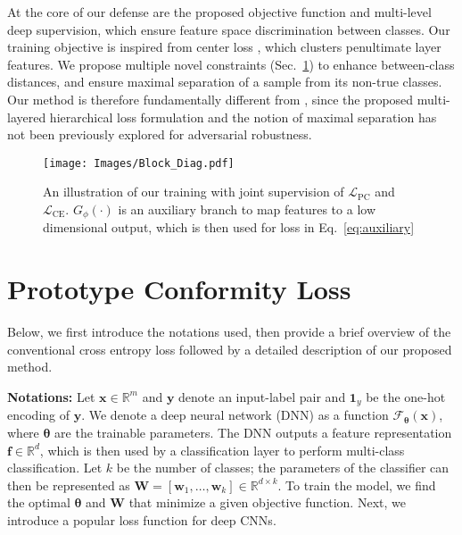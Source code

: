 \documentclass[10pt,twocolumn,letterpaper]{article}
\begin{document}
At the core of our defense are the proposed objective function and multi-level deep supervision, which ensure feature space discrimination between classes. Our training objective is inspired from center loss \cite{wen2016discriminative}, which clusters penultimate layer features. We propose multiple novel constraints (Sec.~\ref{sec:background}) to enhance between-class distances, and ensure maximal separation of a sample from its non-true classes. Our method is therefore fundamentally different from \cite{wen2016discriminative}, since the proposed multi-layered hierarchical loss formulation and the notion of maximal separation has not been previously explored for adversarial robustness. 























\begin{figure}
    \centering
{\texttt{[image: Images/Block\_Diag.pdf]} }
   \vspace{-1em}
    \caption{\small{An illustration of our training with joint supervision of  $\mathcal{L}_{\text{PC}}$ and  $\mathcal{L}_{\text{CE}}$. $G_{\phi}(\cdot)$ is an auxiliary branch to map features to a low dimensional output, which is then used for loss in Eq.~\ref{eq:auxiliary}}}
    \label{fig:block_diag}\vspace{-0.5em}    
\end{figure}

\section{Prototype Conformity Loss}
\label{sec:background}

Below, we first introduce the notations used, then provide a brief overview of the conventional cross entropy loss followed by a detailed description of our proposed method.

\noindent \textbf{Notations:} Let $\bm{x} \in \mathbb{R}^{m}$ and $\bm{y}$ denote an input-label pair and $\bm{1}_{y}$ be the one-hot encoding of $\bm{y}$. We denote a deep neural network (DNN) as a function $\mathcal{F}_{\bm{\theta}}(\bm{x})$,  where $\bm{\theta}$ are the trainable parameters. The DNN outputs a feature representation $\bm{f}\in \mathbb{R}^d$, which is then used by a classification layer to perform multi-class classification. Let $k$ be the number of classes; the parameters of the classifier can then be represented as $\bm{W} = [\bm{w}_1,\ldots,\bm{w}_k] \in \mathbb{R}^{d\times k}$. To train the model, we find the optimal $\bm{\theta}$ and $\bm{W}$ that minimize a given objective function. Next, we introduce a popular loss function for deep CNNs.
\end{document}
